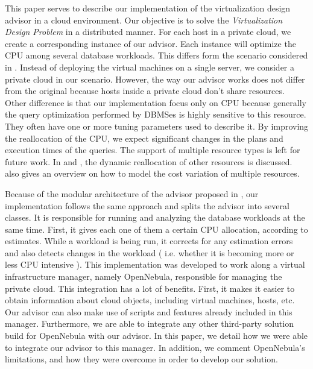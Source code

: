 This paper serves to describe our implementation of the virtualization design advisor in a cloud environment. Our objective is to solve the \textit{Virtualization Design Problem} in a distributed manner. For each host in a private cloud, we create a corresponding instance of our advisor. Each instance will optimize the CPU among several database workloads. This differs form the scenario considered in \cite{Soror:2008:AVM:1376616.1376711}. Instead of deploying the virtual machines on a single server, we consider a private cloud in our scenario. However, the way our advisor works does not differ from the original because hosts inside a private cloud don't share resources. Other difference is that our implementation focus only on CPU because  generally the query optimization performed by DBMSes is highly sensitive to this resource. They often have one or more tuning parameters used to describe it. By improving the reallocation of the CPU, we expect significant changes in the plans and execution times of the queries. The support of multiple resource types is left for future work. In \cite{Storm:2006:ASM:1182635.1164220} and \cite{springerlink:10.1007/3-540-44469-6_9}, the dynamic reallocation of other resources is discussed. \cite{Soror:2008:AVM:1376616.1376711} also gives an overview on how to model the cost variation of multiple resources.



Because of the modular architecture of the advisor proposed in \cite{Soror:2008:AVM:1376616.1376711}, our implementation follows the same approach and splits the advisor into several classes. It is responsible for running and analyzing the database workloads  at the same time. First, it gives each one of them a certain CPU allocation, according to estimates. While a workload is being run, it corrects for any estimation errors and also detects changes in the workload ( i.e. whether it is becoming more or less CPU intensive ). This implementation was developed to work along a virtual infrastructure manager, namely OpenNebula, responsible for managing the private cloud. This integration has a lot of benefits. First, it makes it easier to obtain information about cloud objects, including virtual machines, hosts, etc. Our advisor can also make use of scripts and features already included in this manager. Furthermore, we are able to integrate any other third-party solution build for OpenNebula with our advisor. In this paper, we detail how we were able to integrate our advisor to this manager. In addition, we comment OpenNebula's limitations, and how they were overcome in order to develop our solution.

